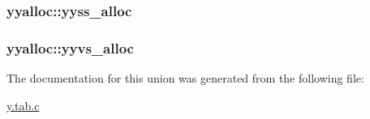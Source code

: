 \subsubsection[{\texorpdfstring{yyss\+\_\+alloc}{yyss_alloc}}]{ yyalloc\+::yyss\+\_\+alloc}\hypertarget{unionyyalloc_a4800e0520a89a4789afa7b5d82197e65}{}\label{unionyyalloc_a4800e0520a89a4789afa7b5d82197e65}
\subsubsection[{\texorpdfstring{yyvs\+\_\+alloc}{yyvs_alloc}}]{ yyalloc\+::yyvs\+\_\+alloc}\hypertarget{unionyyalloc_a9326f4fdc6f737a929444427836d8928}{}\label{unionyyalloc_a9326f4fdc6f737a929444427836d8928}


The documentation for this union was generated from the following file\+:\begin{DoxyCompactItemize}
\item 
\hyperlink{y_8tab_8c}{y.\+tab.\+c}\end{DoxyCompactItemize}

